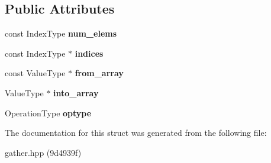 \subsection*{Public Attributes}
\begin{DoxyCompactItemize}
\item 
\mbox{\label{structschwz_1_1Gather_a9c16149747d5a4c77c061d750a27faf2}} 
const Index\+Type {\bfseries num\+\_\+elems}
\item 
\mbox{\label{structschwz_1_1Gather_a8adc05f74bac862e80eae9e5bcd6918d}} 
const Index\+Type $\ast$ {\bfseries indices}
\item 
\mbox{\label{structschwz_1_1Gather_ae45f6ecca9f53252e804c6de1b96f4dd}} 
const Value\+Type $\ast$ {\bfseries from\+\_\+array}
\item 
\mbox{\label{structschwz_1_1Gather_a2edcfcb6bb277db9273a3865a4c2f017}} 
Value\+Type $\ast$ {\bfseries into\+\_\+array}
\item 
\mbox{\label{structschwz_1_1Gather_a8830fdf0a3d07abb1d985fa4cb42bb08}} 
Operation\+Type {\bfseries optype}
\end{DoxyCompactItemize}


The documentation for this struct was generated from the following file\+:\begin{DoxyCompactItemize}
\item 
gather.\+hpp (9d4939f)\end{DoxyCompactItemize}
